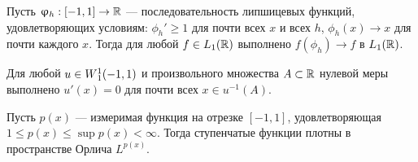 \begin{prop}
\label{prop:conv_to_one}
Пусть $\upvarphi_h: [-1, 1] \to \mathbb R$ --- последовательность липшицевых функций, удовлетворяющих условиям:
$\phi_h' \ge 1$ для почти всех $x$ и всех $h$, $\phi_h( x ) \to x$ для почти каждого $x$.
Тогда для любой $f \in L_1(\mathbb R)$ выполнено $f(\phi_h) \to f$ в $L_1(\mathbb R)$.
\end{prop}

\begin{prop}
\label{prop:level_derivative}
\textrm{\cite[теорема 6.19]{LiebLoss} }
Для любой $u \in W{}_1^1(-1, 1)$ и произвольного множества $A \subset \mathbb R$ нулевой меры выполнено
$u'(x) = 0$ для почти всех $x \in u^{-1}(A)$.
\end{prop}

\begin{prop}
\label{prop:step_dense_orlicz}
Пусть $p(x)$ --- измеримая функция на отрезке $[-1, 1]$, удовлетворяющая
$1 \le p(x) \le \sup p(x) < \infty$.
Тогда ступенчатые функции плотны в пространстве Орлича $L^{p(x)}$.
\end{prop}
